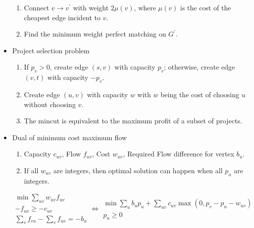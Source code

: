 \begin{itemize}
\begin{enumerate}
      \item Connect $v \to v^\prime$ with weight $2\mu(v)$, where $\mu(v)$ is the cost of the cheapest edge incident to $v$.
      \item Find the minimum weight perfect matching on $G^\prime$.
    \end{enumerate}
    \item Project selection problem
    \begin{enumerate}
      \item If $p_v > 0$, create edge $(s, v)$ with capacity $p_v$; otherwise, create edge $(v, t)$ with capacity $-p_v$.
      \item Create edge $(u, v)$ with capacity $w$ with $w$ being the cost of choosing $u$ without choosing $v$.
      \item The mincut is equivalent to the maximum profit of a subset of projects.
    \end{enumerate}
    \item Dual of minimum cost maximum flow
    \begin{enumerate}
      \item Capacity $c_{uv}$, Flow $f_{uv}$, Cost $w_{uv}$, Required Flow difference for vertex $b_u$.
      \item If all $w_{uv}$ are integers, then optimal solution can happen when all $p_u$ are integers.
    \end{enumerate}
    $$
    \begin{aligned}\min\sum_{uv} w_{uv}f_{uv} \\ -f_{uv} \geq -c_{uv} \\ \sum_{v} f_{vu} - \sum_{v} f_{uv} = -b_u\end{aligned}
    \Leftrightarrow
    \begin{aligned}\min\sum_{u} b_up_u + \sum_{uv}c_{uv}\max(0, p_v - p_u - w_{uv}) \\ p_u \geq 0 \end{aligned}
    $$
\end{itemize}
